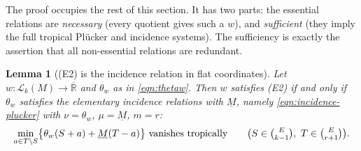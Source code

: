 \documentclass{article}
\newtheorem{lemma}[theorem]{Lemma}
\theoremstyle{definition}
\newcommand{\Rbar}{\overline{\mathbb{R}}}
\newcommand{\cLL}{\mathcal{L}}
\begin{document}
The proof occupies the rest of this section. It has two parts: the essential relations are
\emph{necessary} (every quotient gives such a $w$), and \emph{sufficient} (they imply the full
tropical Pl\"ucker and incidence systems). The sufficiency is exactly the assertion that all
non-essential relations are redundant.

\begin{lemma}[(E2) is the incidence relation in flat coordinates]\label{lem:E2-incidence}
Let $w\colon\cLL_k(M)\to\Rbar$ and $\theta_w$ as in \eqref{eqn:thetaw}. Then $w$ satisfies
\textup{(E2)} if and only if $\theta_w$ satisfies the elementary incidence relations with
$\underline M$, namely \eqref{eqn:incidence-plucker} with $\nu=\theta_w$, $\mu=\underline M$,
$m=r$:
\begin{equation}\label{eqn:incid-r}
  \min_{a\in T\setminus S}\bigl\{\theta_w(S+a)+\underline M(T-a)\bigr\}\ \text{vanishes tropically}
  \qquad\bigl(S\in\tbinom{E}{k-1},\ T\in\tbinom{E}{r+1}\bigr).
\end{equation}
\end{lemma}
\end{document}
